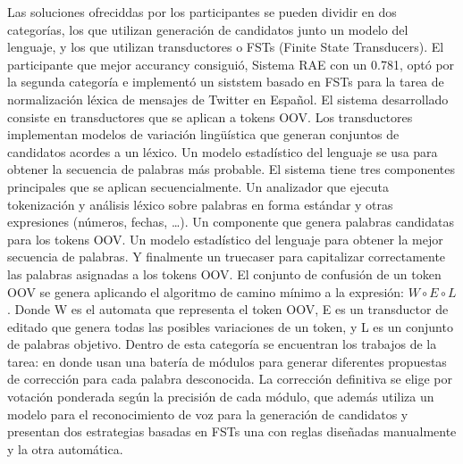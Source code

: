 \documentclass[spanish,12pt, a4paper,twoside]{paper}
\begin{document}
Las soluciones ofreciddas por los participantes se pueden dividir en dos categorías, los que utilizan generación de candidatos junto un modelo del lenguaje, y los que utilizan transductores o FSTs (Finite State Transducers). El participante que mejor accurancy consiguió, Sistema RAE \cite{porta:2013} con un 0.781, optó por la segunda categoría e implementó un siststem basado en FSTs para la tarea de normalización léxica de mensajes de Twitter en Español. El sistema desarrollado consiste en transductores que se aplican a tokens OOV. Los transductores implementan modelos de variación lingüística que generan conjuntos de candidatos acordes a un léxico. Un modelo estadístico del lenguaje se usa para obtener la secuencia de palabras más probable. El sistema tiene tres componentes principales que se aplican secuencialmente. Un analizador que ejecuta tokenización y análisis léxico sobre palabras en forma estándar y otras expresiones (números, fechas, …). Un componente que genera palabras candidatas para los tokens OOV. Un modelo estadístico del lenguaje para obtener la mejor secuencia de palabras. Y finalmente un truecaser para capitalizar correctamente las palabras asignadas a los tokens OOV. El conjunto de confusión de un token OOV se genera aplicando el algoritmo de camino mínimo a la expresión: $W \circ E \circ L$. Donde W es el automata que representa el token OOV, E es un transductor de editado que genera todas las posibles variaciones de un token, y L es un conjunto de palabras objetivo. Dentro de esta categoría se encuentran los trabajos de la tarea: \cite{ageno:2013} en donde usan una batería de módulos para generar diferentes propuestas de corrección para cada palabra desconocida. La corrección definitiva se elige por votación ponderada según la precisión de cada módulo, \cite{alegria:2013} que además utiliza un modelo para el reconocimiento de voz para la generación de candidatos y \cite{huldenfrancom:2013} presentan dos estrategias basadas en FSTs una con reglas diseñadas manualmente y la otra automática.\\
\end{document}

